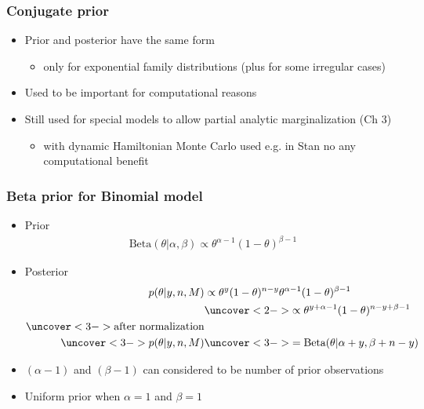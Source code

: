 \documentclass[10pt]{beamer}
\begin{document}
\begin{frame}

  \frametitle{Conjugate prior}

  \begin{itemize}
  \item Prior and posterior have the same form
    \begin{itemize}
    \item only for exponential family distributions (plus for
      some irregular cases)
    \end{itemize}
    \pause
  \item Used to be important for computational reasons
  \item Still used for special models to allow partial analytic
    marginalization (Ch 3)
  \begin{itemize}
  \item with dynamic Hamiltonian Monte Carlo used e.g. in Stan no any
      computational benefit
  \end{itemize}
  \end{itemize}

\end{frame}

\begin{frame}

  \frametitle{Beta prior for Binomial model}

  \begin{itemize}
  \item Prior \baselineskip
    \begin{align*}
      \text{Beta}(\theta|\alpha,\beta) \propto \theta^{\alpha-1}
      (1-\theta)^{\beta-1}
    \end{align*}
  \item Posterior
    \baselineskip
    \begin{align*}
      p(\theta|y,n,M) & \propto \theta^y(1-\theta)^{n-y}
      \theta^{\alpha-1} (1-\theta)^{\beta-1}\\
      &\uncover<2->{ \propto
        \theta^{y+\alpha-1} (1-\theta)^{n-y+\beta-1}}\\
      \uncover<3->{\text{after normalization}} &\\
      \uncover<3->{p(\theta|y,n,M)}
      &\uncover<3->{ = \text{Beta}(\theta|\alpha+y,\beta+n-y)}
    \end{align*}
    \vskip -2mm
  \item<4-> $(\alpha-1)$ and $(\beta-1)$ can considered to be number of prior observations
  \item<4-> Uniform prior when $\alpha=1$ and $\beta=1$
  \end{itemize}
\end{frame}
\end{document}
